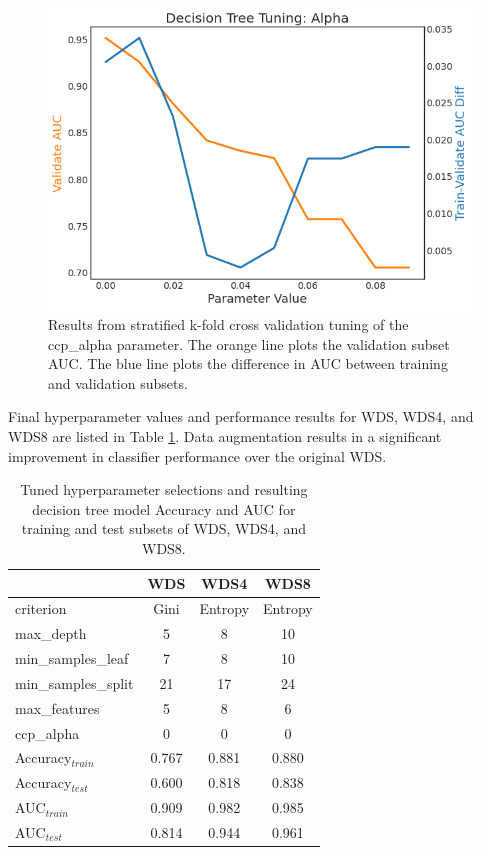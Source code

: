\begin{figure}[!htp]
\centering
\includegraphics[width=.6\textwidth]{templates/images/Figure-DT_tuning_alpha.png}
\caption[Decision tree alpha tuning]{Results from stratified k-fold cross validation tuning of the ccp\_alpha parameter. The orange line plots the validation subset AUC. The blue line plots the difference in AUC between training and validation subsets.}
\label{fig:dtree_alpha}
\end{figure}

Final hyperparameter values and performance results for WDS, WDS4, and WDS8 are listed in Table \ref{tab:dtree_tuning}. Data augmentation results in a significant improvement in classifier performance over the original WDS.

\begin{table}[!htp]
\centering
\begin{tabular}{l|c|c|c|}
\cline{2-4}
                                          & WDS & WDS4 & WDS8 \\ \hline
\multicolumn{1}{|l|}{criterion}           & Gini & Entropy & Entropy \\ \hline
\multicolumn{1}{|l|}{max\_depth}          & 5    & 8    & 10   \\ \hline
\multicolumn{1}{|l|}{min\_samples\_leaf}  & 7    & 8    & 10   \\ \hline
\multicolumn{1}{|l|}{min\_samples\_split} & 21   & 17   & 24   \\ \hline
\multicolumn{1}{|l|}{max\_features}       & 5    & 8    & 6    \\ \hline
\multicolumn{1}{|l|}{ccp\_alpha}          & 0    & 0    & 0    \\ \hline
\multicolumn{1}{|l|}{Accuracy$_{train}$}  & 0.767 & 0.881 & 0.880 \\ \hline
\multicolumn{1}{|l|}{Accuracy$_{test}$}   & 0.600 & 0.818 & 0.838 \\ \hline
\multicolumn{1}{|l|}{AUC$_{train}$}       & 0.909 & 0.982 & 0.985 \\ \hline
\multicolumn{1}{|l|}{AUC$_{test}$}        & 0.814 & 0.944 & 0.961 \\ \hline
\end{tabular}
\caption[Decision tree hyperparameter values]{Tuned hyperparameter selections and resulting decision tree model Accuracy and AUC for training and test subsets of WDS, WDS4, and WDS8.}
\label{tab:dtree_tuning}
\end{table}

